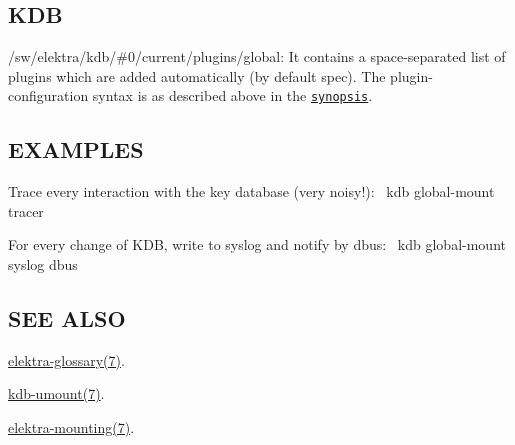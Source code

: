\subsection*{K\+DB}


\begin{DoxyItemize}
\item {\ttfamily /sw/elektra/kdb/\#0/current/plugins/global}\+: It contains a space-\/separated list of plugins which are added automatically (by default {\ttfamily spec}). The plugin-\/configuration syntax is as described above in the \href{#SYNOPSIS}{\tt synopsis}.
\end{DoxyItemize}

\subsection*{E\+X\+A\+M\+P\+L\+ES}

Trace every interaction with the key database (very noisy!)\+:~\newline
 {\ttfamily kdb global-\/mount tracer}

For every change of K\+DB, write to syslog and notify by dbus\+:~\newline
 {\ttfamily kdb global-\/mount syslog dbus}

\subsection*{S\+EE A\+L\+SO}


\begin{DoxyItemize}
\item \hyperlink{doc_help_elektra-glossary_md}{elektra-\/glossary(7)}.
\item \hyperlink{doc_help_kdb-umount_md}{kdb-\/umount(7)}.
\item \hyperlink{doc_help_elektra-mounting_md}{elektra-\/mounting(7)}. 
\end{DoxyItemize}